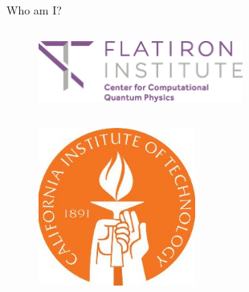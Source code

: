 \begin{frame}{Who am I?}
\begin{columns}
\begin{column}[T]{0.3\textwidth}
\begin{figure}[T]
    \end{figure}

    \begin{figure}

      \centering
      \includegraphics[width=0.6\textwidth]{
        slides/assets/who-am-i-flatiron-institute-ccq.jpg
      }

    \end{figure}

    \begin{columns}

      \begin{column}[T, onlytextwidth]{0.5\textwidth}%

        \begin{figure}
          \includegraphics[width=0.6\textwidth]{
            slides/assets/who-am-i-caltech.jpg
          }
        \end{figure}
      \end{column}

      \begin{column}[T, onlytextwidth]{0.5\textwidth}%


\end{column}
\end{columns}
\end{column}
\end{columns}
\end{frame}
